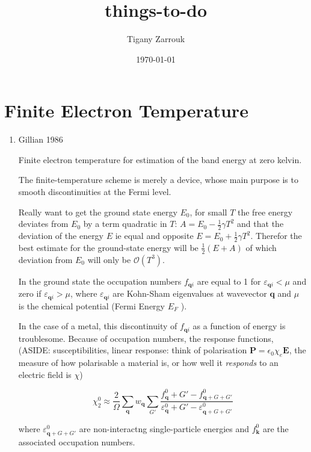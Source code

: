 \documentclass[11pt]{article}
\author{Tigany Zarrouk}
\date{\today}
\title{things-to-do}
\begin{document}
\maketitle
\tableofcontents

\section{Finite Electron Temperature}
\label{sec:org0bc5cb8}
\begin{enumerate}
\item Gillian 1986
\label{sec:org472883d}
\cite{Gillan1989}

Finite electron temperature for estimation of the band energy at zero kelvin. 

The finite-temperature scheme is merely a device, whose main purpose is to
smooth discontinuities at the Fermi level.

Really want to get the ground state energy \(E_0\), for small \(T\) the free
energy deviates from \(E_0\) by a term quadratic in \(T\): \(A = E_0 -
\frac{1}{2}\gamma T^2\) and that the deviation of the energy \(E\) ie equal and
opposite \(E = E_0 + \frac{1}{2}\gamma T^2\). Therefor the best estimate for the
ground-state energy will be \(\frac{1}{2}(E + A)\) of which deviation from \(E_0\)
will only be \(\mathcal{O}(T^3)\).

In the ground state the occupation numbers \(f_{\mathbf{q}i}\) are equal to 1
for \(\varepsilon_{\mathbf{q} i} < \mu\) and zero if \(\varepsilon_{\mathbf{q} i}
> \mu\), where \(\varepsilon_{\mathbf{q} i}\) are Kohn-Sham eigenvalues at
wavevector \(\mathbf{q}\) and \(\mu\) is the chemical potential (Fermi Energy
\(E_F\) ).

In the case of a metal, this discontinuity of \(f_{\mathbf{q}i}\) as a function
of energy is troublesome. Because of occupation numbers, the response
functions, (ASIDE: susceptibilities, linear response: think of polarisation
\(\mathbf{P} = \epsilon_0 \chi_{e} \mathbf{E}\), the measure of how
polarisable a material is, or how well it \emph{responds} to an electric field is
\(\chi\)) 

\[
\chi_2^0 \approx \frac{2}{\Omega} \sum_{\mathbf{q}} w_{\mathbf{q}}\sum_{G'} 
     \frac{ f_{\mathbf{q}}^0 + G'  - f_{\mathbf{q} + G + G'}^0
     }{\varepsilon_{\mathbf{q}}^0 +  G'  - \varepsilon_{\mathbf{q} + G + G'}^0 }
\]

where \(\varepsilon_{\mathbf{q} + G + G'}^0\) are non-interactng single-particle
energies and \(f_{\mathbf{k}}^0\) are the associated occupation numbers. 


\end{enumerate}
\end{document}
